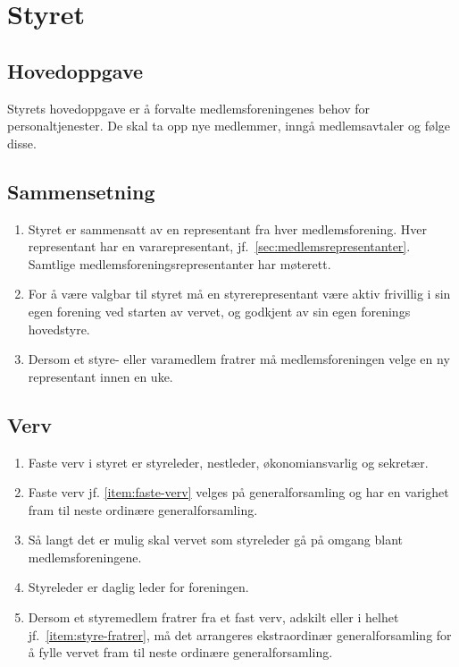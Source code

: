 \documentclass[11pt,norsk,a4paper]{article}
\renewcommand{\thesection}{§ \arabic{section}}
\renewcommand{\thesubsection}{\thesection-\arabic{subsection}}
\renewcommand{\theenumi}{\alph{enumi}}
\begin{document}
\section{Styret}
\subsection{Hovedoppgave}
Styrets hovedoppgave er å forvalte medlemsforeningenes behov for personaltjenester.
De skal ta opp nye medlemmer, inngå medlemsavtaler og følge disse.

\subsection{Sammensetning\label{sec:sammensetning}}
\begin{enumerate}[ref=\thesubsection~punkt \theenumi]
	\item Styret er sammensatt av en representant fra hver medlemsforening. Hver representant har en vararepresentant, jf.~\ref{sec:medlemsrepresentanter}. Samtlige medlemsforeningsrepresentanter har møterett.
	\item For å være valgbar til styret må en styrerepresentant være aktiv frivillig i sin egen forening ved starten av vervet, og godkjent av sin egen forenings hovedstyre\label{item:valgbar}.
	\item Dersom et styre- eller varamedlem fratrer må medlemsforeningen velge en ny representant innen en uke\label{item:styre-fratrer}.
\end{enumerate}

\subsection{Verv}
\begin{enumerate}
	\item Faste verv i styret er styreleder, nestleder, økonomiansvarlig og sekretær\label{item:faste-verv}. 
	\item Faste verv jf. \cref{item:faste-verv} velges på generalforsamling og har en varighet fram til neste ordinære generalforsamling.
	\item Så langt det er mulig skal vervet som styreleder gå på omgang blant medlemsforeningene. 
	\item Styreleder er daglig leder for foreningen.
	\item Dersom et styremedlem fratrer fra et fast verv, adskilt eller i helhet jf.~\ref{item:styre-fratrer}, må det arrangeres ekstraordinær generalforsamling for å fylle vervet fram til neste ordinære generalforsamling.
\end{enumerate}
\end{document}
